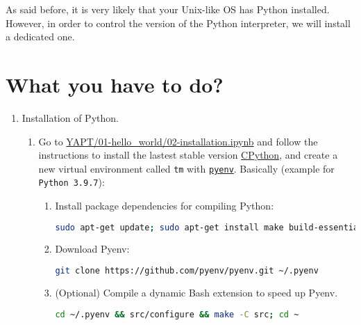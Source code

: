 As said before, it is very likely that your Unix-like OS has Python
installed. However, in order to control the version of the Python
interpreter, we will install a dedicated one.

\section{What you have to do?}

\begin{enumerate}
  
\item Installation of Python.
  
  \begin{enumerate}
    
  \item Go to
    \href{https://github.com/vicente-gonzalez-ruiz/YAPT/blob/master/01-hello_world/02-installation.ipynb}{YAPT/01-hello\_world/02-installation.ipynb}
    \cite{YAPT} and follow the instructions to install the lastest
    stable version
    \href{https://en.wikipedia.org/wiki/CPython}{CPython}, and create
    a new virtual environment called \texttt{tm} with
    \href{https://github.com/pyenv/pyenv}{\texttt{pyenv}}. Basically
    (example for \verb|Python 3.9.7|):

    \begin{enumerate}
    \item Install package dependencies for compiling Python:
      
      \begin{lstlisting}[mathescape=false, language=Bash]
sudo apt-get update; sudo apt-get install make build-essential libssl-dev zlib1g-dev libbz2-dev libreadline-dev libsqlite3-dev wget curl llvm libncursesw5-dev xz-utils tk-dev libxml2-dev libxmlsec1-dev libffi-dev liblzma-dev
\end{lstlisting}

\item Download Pyenv:
  \begin{lstlisting}[mathescape=false, language=Bash]
git clone https://github.com/pyenv/pyenv.git ~/.pyenv
\end{lstlisting}
        
\item (Optional) Compile a dynamic Bash extension to speed up Pyenv.
  \begin{lstlisting}[mathescape=false, language=Bash]
cd ~/.pyenv && src/configure && make -C src; cd ~
\end{lstlisting}


\end{enumerate}
\end{enumerate}
\end{enumerate}

